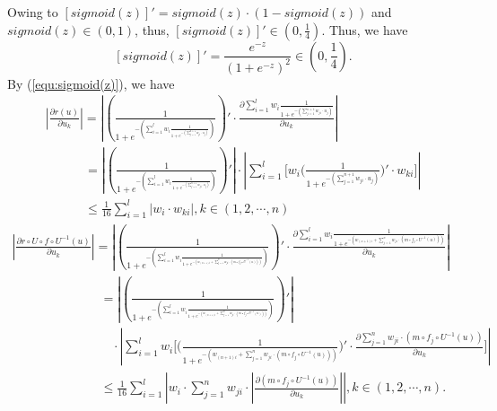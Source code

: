 Owing to $[sigmoid(z)]' = sigmoid(z)\cdot(1 - sigmoid(z))$ and  $sigmoid(z) \in (0,1)$, thus, $[sigmoid(z)]' \in (0,\frac{1}{4})$.
Thus, we have
\begin{equation}\label{equ:sigmoid(z)}
[sigmoid(z)]' = \frac{{{e^{ - z}}}}{{{{(1 + {e^{ - z}})}^2}}} \in (0,\frac{1}{4}).
\end{equation}
By (\ref{equ:sigmoid(z)}), we have
\begin{equation}\label{equ:|r(u)/u_k|}
\begin{array}{l}
\left| {\frac{{\partial r(u)}}{{\partial {u_k}}}} \right| = \left| {(\frac{1}{{1 + {e^{ - (\sum\limits_{i = 1}^l {{w_i}\frac{1}{{1 + {e^{ - (\sum\limits_{j = 1}^{n+1} {{w_{ji}}\cdot{u_j}} )}}}}} )}}}})'\cdot\frac{{\partial \sum\limits_{i = 1}^l {{w_i}\frac{1}{{1 + {e^{ - (\sum\limits_{j = 1}^{n+1} {{w_{ji}}\cdot{u_j}} )}}}}} }}{{\partial {u_k}}}} \right|\\
\quad \;\;\;\quad \; = \left| {(\frac{1}{{1 + {e^{ - (\sum\limits_{i = 1}^l {{w_i}\frac{1}{{1 + {e^{ - (\sum\limits_{j = 1}^{n+1} {{w_{ji}}\cdot{u_j}} )}}}}} )}}}})'} \right|\cdot\left| {\sum\limits_{i = 1}^l {[{w_i}(\frac{1}{{1 + {e^{ - (\sum\limits_{j = 1}^{n+1} {{w_{ji}}\cdot{u_j}} )}}}}} )'\cdot{w_{ki}}]} \right|\\
\quad \;\;\;\quad \; \le \frac{1}{{16}}\sum\limits_{i = 1}^l {\left| {{w_i}\cdot{w_{ki}}} \right|} ,k \in (1,2, \cdots ,n)
\end{array}
\end{equation}
\begin{equation}\label{equ:|r(u')/u_k|}
\begin{array}{l}
\left| {\frac{{\partial r \circ U \circ f \circ {U^{ - 1}}(u)}}{{\partial {u_k}}}} \right| = \left| {(\frac{1}{{1 + {e^{ - (\sum\limits_{i = 1}^l {{w_i}\frac{1}{{1 + {e^{ - ({w_{(n + 1)i}} + \sum\limits_{j = 1}^n {{w_{ji}}\cdot(m \circ {f_j} \circ {U^{ - 1}}(u))} )}}}}} )}}}})'\cdot\frac{{\partial \sum\limits_{i = 1}^l {{w_i}\frac{1}{{1 + {e^{ - ({w_{(n + 1)i}} + \sum\limits_{j = 1}^n {{w_{ji}}\cdot(m \circ {f_j} \circ {U^{ - 1}}(u))} )}}}}} }}{{\partial {u_k}}}} \right|\;\\
\;\;\quad \quad \,\quad \quad \quad \quad \;= \left| {(\frac{1}{{1 + {e^{ - (\sum\limits_{i = 1}^l {{w_i}\frac{1}{{1 + {e^{ - ({w_{(n + 1)i}} + \sum\limits_{j = 1}^n {{w_{ji}}\cdot(m \circ {f_j} \circ {U^{ - 1}}(u))} )}}}}} )}}}})'} \right|\\\;\;\quad \quad \;\;\quad \quad \;\;\quad \quad \;\cdot\left| {\sum\limits_{i = 1}^l {{w_i}[(\frac{1}{{1 + {e^{ - ({w_{(n + 1)i}} + \sum\limits_{j = 1}^n {{w_{ji}}\cdot(m \circ {f_j} \circ {U^{ - 1}}(u))} )}}}}} )'\cdot\frac{{\partial \sum\limits_{j = 1}^n {{w_{ji}}\cdot(m \circ {f_j} \circ {U^{ - 1}}(u))} }}{{\partial {u_k}}}]} \right|\\
\;\;\quad \quad \,\quad \quad \quad \quad \; \le \frac{1}{{16}}\sum\limits_{i = 1}^l {\left| {{w_i}\cdot\sum\limits_{j = 1}^n {{w_{ji}}\cdot\left| {\frac{{\partial (m \circ {f_j} \circ {U^{ - 1}}(u))}}{{\partial {u_k}}}} \right|} } \right|} ,k \in (1,2, \cdots ,n).
\end{array}
\end{equation}

